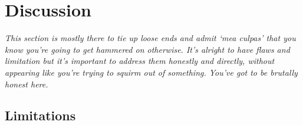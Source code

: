 \section{Discussion}
\label{sec:disc}

{\em This section is mostly there to tie up loose ends and admit `mea
  culpas' that you know you're going to get hammered on otherwise.
  It's alright to have flaws and limitation but it's important to
  address them honestly and directly, without appearing like you're
  trying to squirm out of something.  You've got to be brutally honest
  here.}

\subsection{Limitations}


